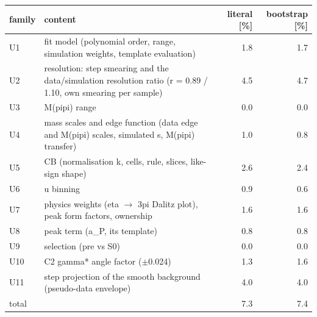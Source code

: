 \begin{tabular}{llrr}
\hline
 family & content & literal [\%] & bootstrap [\%] \\
\hline
 U1 & fit model (polynomial order, range, simulation weights, template evaluation) & 1.8 & 1.7 \\
 U2 & resolution: step smearing and the data/simulation resolution ratio (r = 0.89 / 1.10, own smearing per sample) & 4.5 & 4.7 \\
 U3 & M(pipi) range & 0.0 & 0.0 \\
 U4 & mass scales and edge function (data edge and M(pipi) scales, simulated s, M(pipi) transfer) & 1.0 & 0.8 \\
 U5 & CB (normalisation k, cells, rule, slices, like-sign shape) & 2.6 & 2.4 \\
 U6 & u binning & 0.9 & 0.6 \\
 U7 & physics weights (eta $\to$ 3pi Dalitz plot), peak form factors, ownership & 1.6 & 1.6 \\
 U8 & peak term (a\_P, its template) & 0.8 & 0.8 \\
 U9 & selection (pre vs S0) & 0.0 & 0.0 \\
 U10 & C2 gamma* angle factor ($\pm$0.024) & 1.3 & 1.6 \\
 U11 & step projection of the smooth background (pseudo-data envelope) & 4.0 & 4.0 \\
\hline
 total & & 7.3 & 7.4 \\
\hline
\end{tabular}
